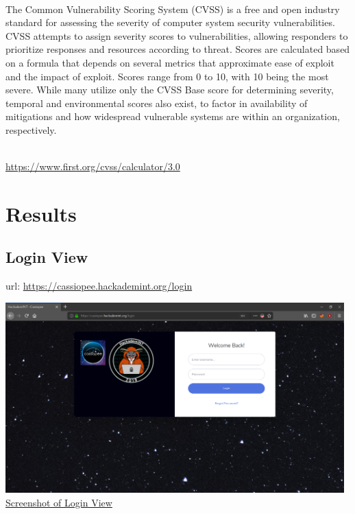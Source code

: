 \vspace{1cm}

\\
The Common Vulnerability Scoring System (CVSS) is a free and open industry standard for assessing the severity of computer system security vulnerabilities. CVSS attempts to assign severity scores to vulnerabilities, allowing responders to prioritize responses and resources according to threat. Scores are calculated based on a formula that depends on several metrics that approximate ease of exploit and the impact of exploit. Scores range from 0 to 10, with 10 being the most severe. While many utilize only the CVSS Base score for determining severity, temporal and environmental scores also exist, to factor in availability of mitigations and how widespread vulnerable systems are within an organization, respectively.

\\
\vspace{0.2cm}
\url{https://www.first.org/cvss/calculator/3.0}

\pagebreak

\section{Results}

\subsection{Login View}
url: \url{https://cassiopee.hackademint.org/login}
\\
\begin{center}
\includegraphics[width=0.98\textwidth]{images/flask-application-01.png}
\\
\underline{Screenshot of Login View}
\end{center}

